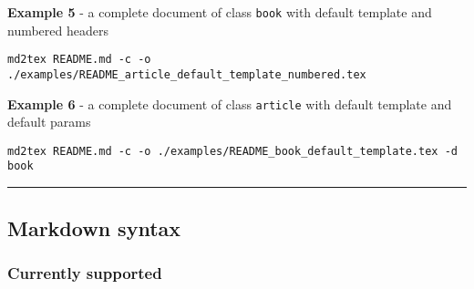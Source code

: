 \documentclass[a4paper, 12pt, twoside]{article}
\begin{document}
\textbf{Example 5} - a complete document of class \texttt{book} with default template and numbered headers

\begin{listing}[h!]
   \begin{verbatim}
md2tex README.md -c -o ./examples/README_article_default_template_numbered.tex

   \end{verbatim}
\end{listing}

\textbf{Example 6} - a complete document of class \texttt{article} with default template and default params

\begin{listing}[h!]
   \begin{verbatim}
md2tex README.md -c -o ./examples/README_book_default_template.tex -d book

   \end{verbatim}
\end{listing}

\par\noindent\rule{\linewidth}{0.4pt}
\subsection{Markdown syntax}
\subsubsection{Currently supported}
\end{document}

